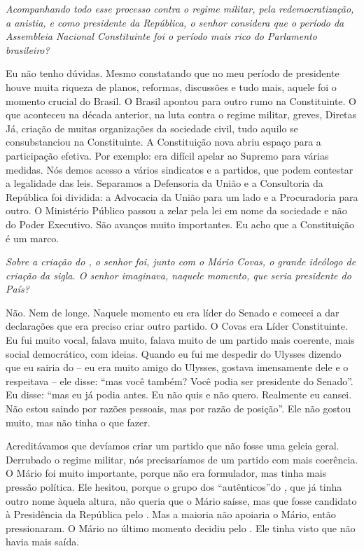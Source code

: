 \medskip

\emph{Acompanhando todo esse processo contra o regime militar, pela
redemocratização, a anistia, e como presidente da República, o senhor
considera que o período da Assembleia Nacional Constituinte foi o
período mais rico do Parlamento brasileiro?}

Eu não tenho dúvidas. Mesmo constatando que no meu período
de presidente houve muita riqueza de planos, reformas, discussões e tudo
mais, aquele foi o momento crucial do Brasil. O Brasil apontou para
outro rumo na Constituinte. O que aconteceu na década anterior, na luta
contra o regime militar, greves, Diretas Já, criação de muitas
organizações da sociedade civil, tudo aquilo se consubstanciou na
Constituinte. A Constituição nova abriu espaço para a participação
efetiva. Por exemplo: era difícil apelar ao Supremo para várias medidas.
Nós demos acesso a vários sindicatos e a partidos, que podem contestar a
legalidade das leis. Separamos a Defensoria da União e a Consultoria da
República foi dividida: a Advocacia da União para um lado e a
Procuradoria para outro. O Ministério Público passou a zelar pela lei em
nome da sociedade e não do Poder Executivo. São avanços muito
importantes. Eu acho que a Constituição é um marco.

\medskip

\emph{Sobre a criação do , o senhor foi, junto com o Mário Covas,
o grande ideólogo de criação da sigla. O senhor imaginava, naquele
momento, que seria presidente do País?}

Não. Nem de longe. Naquele momento eu era líder do Senado
e comecei a dar declarações que era preciso criar outro partido. O Covas
era Líder Constituinte. Eu fui muito vocal, falava muito, falava muito
de um partido mais coerente, mais social democrático, com ideias. Quando
eu fui me despedir do Ulysses dizendo que eu sairia do  -- eu era
muito amigo do Ulysses, gostava imensamente dele e o respeitava -- ele
disse: ``mas você também? Você podia ser presidente do Senado''. Eu
disse: ``mas eu já podia antes. Eu não quis e não quero. Realmente eu
cansei. Não estou saindo por razões pessoais, mas por razão de
posição''. Ele não gostou muito, mas não tinha o que fazer.

Acreditávamos que devíamos criar um partido que não fosse uma geleia
geral. Derrubado o regime militar, nós precisaríamos de um partido com
mais coerência. O Mário foi muito importante, porque não era formulador,
mas tinha mais pressão política. Ele hesitou, porque o grupo dos
``autênticos''do , que já tinha outro nome àquela altura, não queria
que o Mário saísse, mas que fosse candidato à Presidência da República
pelo . Mas a maioria não apoiaria o Mário, então pressionaram. O
Mário no último momento decidiu pelo . Ele tinha visto que não havia
mais saída.

